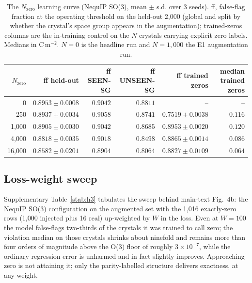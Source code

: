 \begin{table}[htbp]
\centering
\caption{The $N_{\mathrm{zero}}$ learning curve (NequIP SO(3), mean $\pm$ s.d. over 3 seeds). ff, false-flag fraction at the operating threshold on the held-out 2,000 (global and split by whether the crystal's space group appears in the augmentation); trained-zeros columns are the in-training control on the $N$ crystals carrying explicit zero labels. Medians in C\,m$^{-2}$. $N{=}0$ is the headline run and $N{=}1{,}000$ the E1 augmentation run.}
\label{stab:t3}
\fontsize{7bp}{8.5bp}\selectfont
\begin{tabular}{rrrrrr}
\toprule
$N_{\mathrm{zero}}$ & ff held-out & ff SEEN-SG & ff UNSEEN-SG & ff trained zeros & median trained zeros \\
\midrule
0 & $0.8953 \pm 0.0008$ & $0.9042$ & $0.8811$ & -- & -- \\
250 & $0.8937 \pm 0.0034$ & $0.9058$ & $0.8741$ & $0.7519 \pm 0.0038$ & $0.116$ \\
1{,}000 & $0.8905 \pm 0.0030$ & $0.9042$ & $0.8685$ & $0.8953 \pm 0.0020$ & $0.120$ \\
4{,}000 & $0.8818 \pm 0.0035$ & $0.9018$ & $0.8498$ & $0.8865 \pm 0.0014$ & $0.086$ \\
16{,}000 & $0.8582 \pm 0.0201$ & $0.8904$ & $0.8064$ & $0.8827 \pm 0.0109$ & $0.064$ \\
\bottomrule
\end{tabular}
\end{table}

\subsection*{Loss-weight sweep}

Supplementary Table~\ref{stab:h3} tabulates the sweep behind main-text Fig.~4b: the NequIP SO(3) configuration on the augmented set with the 1,016 exactly-zero rows (1,000 injected plus 16 real) up-weighted by $W$ in the loss. Even at $W = 100$ the model false-flags two-thirds of the crystals it was trained to call zero; the violation median on those crystals shrinks about ninefold and remains more than four orders of magnitude above the O(3) floor of roughly $3\times10^{-7}$, while the ordinary regression error is unharmed and in fact slightly improves. Approaching zero is not attaining it; only the parity-labelled structure delivers exactness, at any weight.

